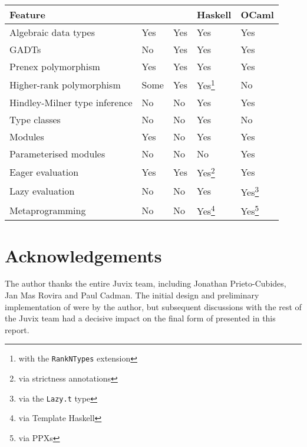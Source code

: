 \documentclass[
    9pt,            %
    techreport,        %
    affiltop,       %
]{art}
\begin{document}
\vspace*{2mm}
\begin{minipage}[b]{\hsize}\centering

\begin{tabular}{lllll}
\hline
\textbf{Feature} & \textbf{\Juvix{}} & \textbf{\JuvixCore{}} &
\textbf{Haskell} & \textbf{OCaml} \\ \hline
Algebraic data types  &  Yes   &  Yes   &  Yes  & Yes \\
GADTs  &  No   &  Yes   &  Yes &  Yes  \\
Prenex polymorphism  &  Yes   &  Yes &  Yes  &  Yes \\
Higher-rank polymorphism  &  Some   &  Yes   &  Yes\footnote{with the
\texttt{RankNTypes} extension}  &   No  \\
Hindley-Milner type inference & No & No & Yes & Yes \\
Type classes  &  No   &  No   &  Yes &   No \\
Modules  &  Yes   &  No   &  Yes &   Yes \\
Parameterised modules  &  No   &  No   &  No &   Yes \\
Eager evaluation  &  Yes   &  Yes   &  Yes\footnote{via strictness
annotations} &   Yes \\
Lazy evaluation  &  No  &  No &  Yes &   Yes\footnote{via the
\texttt{Lazy.t} type} \\
Metaprogramming  &  No   &  No   &  Yes\footnote{via Template Haskell} &
Yes\footnote{via PPXs} \\
\hline
\end{tabular}
\end{minipage}


\section*{Acknowledgements}

The author thanks the entire Juvix team, including Jonathan Prieto-Cubides,
Jan Mas Rovira and Paul Cadman. The initial design and preliminary
implementation of \JuvixCore{} were by the author, but subsequent
discussions with the rest of the Juvix team had a decisive impact on the
final form of \JuvixCore{} presented in this report.

\nocite{*}

\end{document}
